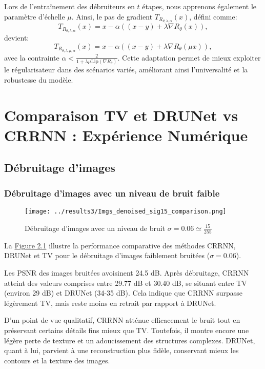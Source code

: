 \documentclass[a4paper, 12pt]{report} %
\begin{document}
Lors de l'entraînement des débruiteurs en \( t \) étapes, nous apprenons également le paramètre d'échelle \( \mu \). Ainsi, le pas de gradient \( T_{R_{\theta, \lambda, \alpha}}(x) \), défini comme:
\[
T_{R_{\theta, \lambda, \alpha}}(x) = x - \alpha \left( (x - y) + \lambda \nabla R_\theta(x) \right),
\]
devient:
\[
T_{R_{\theta, \lambda, \mu, \alpha}}(x) = x - \alpha \left( (x - y) + \lambda \nabla R_\theta(\mu x) \right),
\]
avec la contrainte \( \alpha < \frac{2}{1 + \lambda \mu \text{Lip}(\nabla R_\theta)} \). Cette adaptation permet de mieux exploiter le régularisateur dans des scénarios variés, améliorant ainsi l'universalité et la robustesse du modèle.

\section{Comparaison TV et DRUNet vs CRRNN : Expérience Numérique} 
\subsection{Débruitage d'images}
\subsubsection{Débruitage d'images avec un niveau de bruit faible}
\begin{figure}[H]
\centering
\begin{adjustbox}{width=1.1 \linewidth, totalheight=0.47 \textheight, angle=0, scale= 0.85, minipage= 4.2\linewidth, margin= 0}
    \texttt{[image: ../results3/Imgs\_denoised\_sig15\_comparison.png]}
\end{adjustbox}
    \caption{Débruitage d'images avec un niveau de bruit  $\sigma = 0.06 \simeq \frac{15}{255}$}
    \label{fig:12}
\end{figure}

La \hyperref[fig:12]{Figure 2.1} illustre la performance comparative des méthodes CRRNN, DRUNet et TV pour le débruitage d’images faiblement bruitées ($\sigma = 0.06$).

Les PSNR des images bruitées avoisinent 24.5 dB. Après débruitage, CRRNN atteint des valeurs comprises entre 29.77 dB et 30.40 dB, se situant entre TV (environ 29 dB) et DRUNet (34-35 dB). Cela indique que CRRNN surpasse légèrement TV, mais reste moins en retrait par rapport à DRUNet.

D’un point de vue qualitatif, CRRNN atténue efficacement le bruit tout en préservant certains détails fins mieux que TV. Toutefois, il montre encore une légère perte de texture et un adoucissement des structures complexes. DRUNet, quant à lui, parvient à une reconstruction plus fidèle, conservant mieux les contours et la texture des images.
\end{document}

